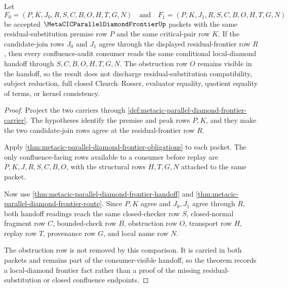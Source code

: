 \begin{theorem}
\label{thm:metacic-local-diamond-frontier}
Let
$$
F_0=(P,K,J_0,R,S,C,B,O,H,T,G,N)
\quad\text{and}\quad
F_1=(P,K,J_1,R,S,C,B,O,H,T,G,N)
$$
be accepted $\MetaCICParallelDiamondFrontierUp$ packets with the same residual-substitution premise row $P$ and the same critical-pair row $K$. If the candidate-join rows $J_0$ and $J_1$ agree through the displayed residual-frontier row $R$, then every confluence-audit consumer reads the same conditional local-diamond handoff through $S,C,B,O,H,T,G,N$. The obstruction row $O$ remains visible in the handoff, so the result does not discharge residual-substitution compatibility, subject reduction, full closed Church--Rosser, evaluator equality, quotient equality of terms, or kernel consistency.
\end{theorem}
\begin{proof}
Project the two carriers through \autoref{def:metacic-parallel-diamond-frontier-carrier}. The hypotheses identify the premise and peak rows $P,K$, and they make the two candidate-join rows agree at the residual-frontier row $R$.

Apply \autoref{thm:metacic-parallel-diamond-frontier-obligations} to each packet. The only confluence-facing rows available to a consumer before replay are $P,K,J,R,S,C,B,O$, with the structural rows $H,T,G,N$ attached to the same packet.

Now use \autoref{thm:metacic-parallel-diamond-frontier-handoff} and \autoref{thm:metacic-parallel-diamond-frontier-route}. Since $P,K$ agree and $J_0,J_1$ agree through $R$, both handoff readings reach the same closed-checker row $S$, closed-normal fragment row $C$, bounded-check row $B$, obstruction row $O$, transport row $H$, replay row $T$, provenance row $G$, and local name row $N$.

The obstruction row is not removed by this comparison. It is carried in both packets and remains part of the consumer-visible handoff, so the theorem records a local-diamond frontier fact rather than a proof of the missing residual-substitution or closed confluence endpoints.
\end{proof}

